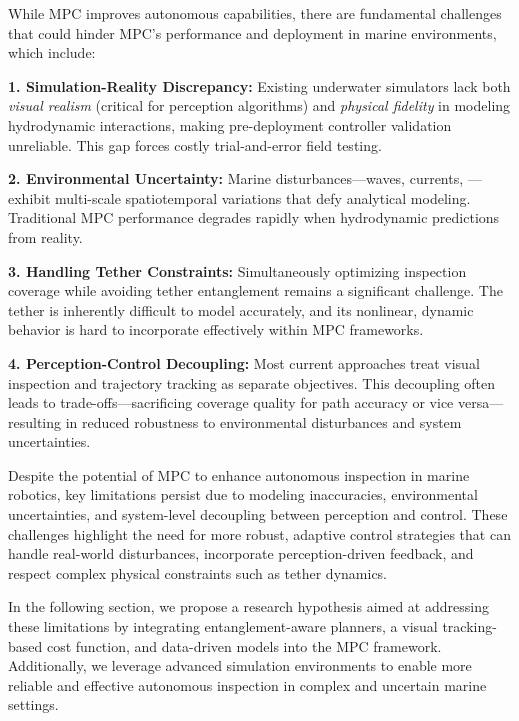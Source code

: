 
While \ac{MPC} improves autonomous capabilities, there are fundamental challenges that could hinder \ac{MPC}'s performance and deployment in marine environments, which include:

\textbf{1. Simulation-Reality Discrepancy:} Existing underwater simulators lack both \textit{visual realism} (critical for perception algorithms) and \textit{physical fidelity} in modeling hydrodynamic interactions, making pre-deployment controller validation unreliable. This gap forces costly trial-and-error field testing.

\textbf{2. Environmental Uncertainty:} Marine disturbances—waves, currents, —exhibit multi-scale spatiotemporal variations that defy analytical modeling. Traditional \ac{MPC} performance degrades rapidly when hydrodynamic predictions from reality.

\textbf{3. Handling Tether Constraints:} Simultaneously optimizing inspection coverage while avoiding tether entanglement remains a significant challenge. The tether is inherently difficult to model accurately, and its nonlinear, dynamic behavior is hard to incorporate effectively within MPC frameworks. 

\textbf{4. Perception-Control Decoupling:} Most current approaches treat visual inspection and trajectory tracking as separate objectives. This decoupling often leads to trade-offs—sacrificing coverage quality for path accuracy or vice versa—resulting in reduced robustness to environmental disturbances and system uncertainties.


Despite the potential of \ac{MPC} to enhance autonomous inspection in marine robotics, key limitations persist due to modeling inaccuracies, environmental uncertainties, and system-level decoupling between perception and control. These challenges highlight the need for more robust, adaptive control strategies that can handle real-world disturbances, incorporate perception-driven feedback, and respect complex physical constraints such as tether dynamics. 

In the following section, we propose a research hypothesis aimed at addressing these limitations by integrating entanglement-aware planners, a visual tracking-based cost function, and data-driven models into the \ac{MPC} framework. Additionally, we leverage advanced simulation environments to enable more reliable and effective autonomous inspection in complex and uncertain marine settings.
